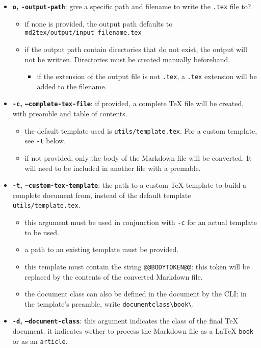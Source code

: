 \documentclass[a4paper, 12pt, twoside]{book}
\begin{document}
\begin{itemize}
\item \textbf{\texttt{o}, \texttt{-output-path}}: give a specific path and filename to write the \texttt{.tex} file to?
\begin{itemize} 
 \item if none is provided, the output path defaults to \texttt{md2tex/output/input\_filename.tex}
\item if the output path contain directories that do not exist, the output will not be 	 written. Directories must be created manually beforehand.
\begin{itemize} 
 \item if the extension of the output file is not \texttt{.tex}, a \texttt{.tex} extension will be added to the filename.
\end{itemize}
\end{itemize}
\item \textbf{\texttt{-c}, \texttt{--complete-tex-file}}: if provided, a complete TeX file will be created, with preamble and table of contents. 
\begin{itemize} 
 \item the default template used is \texttt{utils/template.tex}. For a custom template, see \texttt{-t} below.
\item if not provided, only the body of the Markdown file will be converted. It will need to be included 	 in another file with a premable.
\end{itemize}
\item \textbf{\texttt{-t}, \texttt{--custom-tex-template}}: the path to a custom TeX template to build a complete document from, instead of the default template \texttt{utils/template.tex}.
\begin{itemize} 
 \item this argument must be used in conjunction with \texttt{-c} for an actual template to be used.
\item a path to an existing template must be provided.
\item this template must contain the string \texttt{@@BODYTOKEN@@}: this token will be replaced by the contents of the 	 converted Markdown file.
\item the document class can also be defined in the document by the CLI: 	 in the template's preamble, write \texttt{documentclass\textbackslash{}{book\textbackslash{}}}.
\end{itemize}
\item \textbf{\texttt{-d}, \texttt{--document-class}}: this argument indicates the class of the final TeX document. it indicates wether to process the Markdown file as a LaTeX \texttt{book} or as an \texttt{article}.

\end{itemize}
\end{document}
